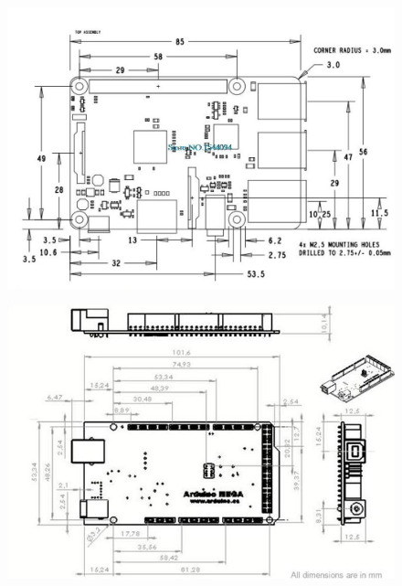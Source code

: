 \begin{figure}[th]
\centering
\begin{minipage}{.5\textwidth}
  \centering
  \includegraphics[width=\linewidth]{Figures/rasp_dimensions.jpeg}
  \label{fig:dimensiones}
\end{minipage}%
\begin{minipage}{.5\textwidth}
  \centering
  \includegraphics[width=\linewidth]{Figures/ARDUINO-MEGA-2560.jpg}
\end{minipage}
\end{figure}

